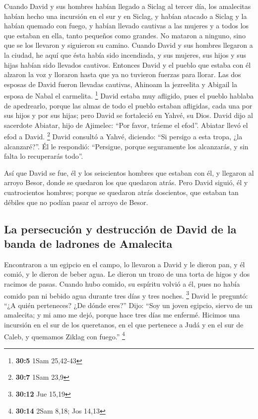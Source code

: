 \begin{paracol}{2}
 Cuando David y sus hombres habían llegado a Siclag al
tercer día, los amalecitas habían hecho una incursión en el sur y en
Siclag, y habían atacado a Siclag y la habían quemado con fuego,
 y habían llevado cautivas a las mujeres y a todos los que
estaban en ella, tanto pequeños como grandes. No mataron a ninguno, sino
que se los llevaron y siguieron su camino.  Cuando David y
sus hombres llegaron a la ciudad, he aquí que ésta había sido
incendiada, y sus mujeres, sus hijos y sus hijas habían sido llevados
cautivos.  Entonces David y el pueblo que estaba con él
alzaron la voz y lloraron hasta que ya no tuvieron fuerzas para llorar.
 Las dos esposas de David fueron llevadas cautivas,
Ahinoam la jezreelita y Abigail la esposa de Nabal el carmelita.
\footnote{\textbf{30:5} 1Sam 25,42-43}  David estaba muy
afligido, pues el pueblo hablaba de apedrearlo, porque las almas de todo
el pueblo estaban afligidas, cada una por sus hijos y por sus hijas;
pero David se fortaleció en Yahvé, su Dios.  David dijo al
sacerdote Abiatar, hijo de Ajimelec: ``Por favor, tráeme el efod''.
Abiatar llevó el efod a David. \footnote{\textbf{30:7} 1Sam 23,9}
 David consultó a Yahvé, diciendo: ``Si persigo a esta
tropa, ¿la alcanzaré?''. Él le respondió: ``Persigue, porque seguramente
los alcanzarás, y sin falta lo recuperarás todo''.

 Así que David se fue, él y los seiscientos hombres que
estaban con él, y llegaron al arroyo Besor, donde se quedaron los que
quedaron atrás.  Pero David siguió, él y cuatrocientos
hombres; porque se quedaron atrás doscientos, que estaban tan débiles
que no podían pasar el arroyo de Besor.

\hypertarget{la-persecuciuxf3n-y-destrucciuxf3n-de-david-de-la-banda-de-ladrones-de-amalecita}{%
\subsection{La persecución y destrucción de David de la banda de
ladrones de
Amalecita}\label{la-persecuciuxf3n-y-destrucciuxf3n-de-david-de-la-banda-de-ladrones-de-amalecita}}

 Encontraron a un egipcio en el campo, lo llevaron a
David y le dieron pan, y él comió, y le dieron de beber agua.
 Le dieron un trozo de una torta de higos y dos racimos
de pasas. Cuando hubo comido, su espíritu volvió a él, pues no había
comido pan ni bebido agua durante tres días y tres noches. \footnote{\textbf{30:12}
  Jue 15,19}  David le preguntó: ``¿A quién perteneces?
¿De dónde eres?'' Dijo: ``Soy un joven egipcio, siervo de un amalecita;
y mi amo me dejó, porque hace tres días me enfermé. 
Hicimos una incursión en el sur de los queretanos, en el que pertenece a
Judá y en el sur de Caleb, y quemamos Ziklag con fuego.'' \footnote{\textbf{30:14}
  2Sam 8,18; Jos 14,13}


\end{paracol}
